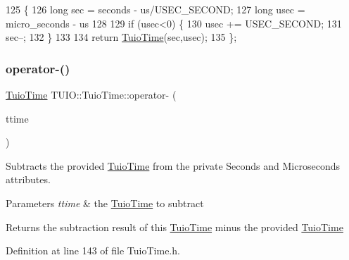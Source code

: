\begin{DoxyCode}
125                                     \{
126             \textcolor{keywordtype}{long} sec = seconds - us/USEC\_SECOND;
127             \textcolor{keywordtype}{long} usec = micro\_seconds - us%
128             
129             \textcolor{keywordflow}{if} (usec<0) \{
130                 usec += USEC\_SECOND;
131                 sec--;
132             \}           
133             
134             \textcolor{keywordflow}{return} \hyperlink{class_t_u_i_o_1_1_tuio_time_a924521ecf43b6484fad9550661eedb0a}{TuioTime}(sec,usec);
135         \};
\end{DoxyCode}
\mbox{\label{class_t_u_i_o_1_1_tuio_time_af72bee5bd9ce897e017a3106b51b3532}} 
\subsubsection{\texorpdfstring{operator-\/()}{operator-()}\hspace{0.1cm}{\footnotesize\ttfamily [2/2]}}
{\footnotesize\ttfamily \hyperlink{class_t_u_i_o_1_1_tuio_time}{Tuio\+Time} T\+U\+I\+O\+::\+Tuio\+Time\+::operator-\/ (\begin{DoxyParamCaption}\item[{\hyperlink{class_t_u_i_o_1_1_tuio_time}{Tuio\+Time}}]{ttime }\end{DoxyParamCaption})\hspace{0.3cm}{\ttfamily [inline]}}

Subtracts the provided \hyperlink{class_t_u_i_o_1_1_tuio_time}{Tuio\+Time} from the private Seconds and Microseconds attributes.


\begin{DoxyParams}{Parameters}
{\em ttime} & the \hyperlink{class_t_u_i_o_1_1_tuio_time}{Tuio\+Time} to subtract \\
\hline
\end{DoxyParams}
\begin{DoxyReturn}{Returns}
the subtraction result of this \hyperlink{class_t_u_i_o_1_1_tuio_time}{Tuio\+Time} minus the provided \hyperlink{class_t_u_i_o_1_1_tuio_time}{Tuio\+Time} 
\end{DoxyReturn}


Definition at line 143 of file Tuio\+Time.\+h.



